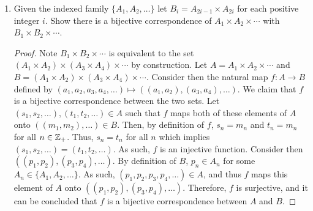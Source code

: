 \documentclass[12pt]{article}
\begin{document}
\begin{enumerate}[label=(\alph*)]
\begin{proof}
			To show $f$ is surjective, consider the element 
			$((c_1, \ldots, c_{n - 1}), c_n)$ in the set being mapped onto by
			$f$. By construction, $c_i \in A_i$ for $1 \leq i \leq n$.
			Thus, $(c_1, \ldots, c_n) \in A_1 \times \cdots \times A_n$.
			By definition of $f$, $f(c_1, \ldots, c_n) = ((c_1, \ldots, c_{n - 1}), c_n)$.
			Thus, we have shown $f$ is also surjective, and therefore we conclude 
			$f$ is bijective.
		\end{proof}
		\item Given the indexed family $\{A_1, A_2, \ldots\}$ let $B_i = A_{2i - 1} \times A_{2i}$ for
		each positive integer $i$. Show there is a bijective correspondence of $A_1 \times A_2 \times \cdots$
		with $B_1 \times B_2 \times \cdots$.
		\begin{proof}
			Note $B_1 \times B_2 \times \cdots$ is equivalent to the set 
			$(A_1 \times A_2) \times (A_3 \times A_4) \times \cdots$ by 
			construction. Let $A = A_1 \times A_2 \times \cdots$ and
			$B = (A_1 \times A_2) \times (A_3 \times A_4) \times \cdots$.
			Consider then the natural map $f: A \to B$ defined by
			$(a_1, a_2, a_3, a_4, \ldots) \mapsto ((a_1, a_2), (a_3, a_4), \ldots)$.
			We claim that $f$ is a bijective correspondence between the two sets.
			Let $(s_1, s_2, \ldots), (t_1, t_2, \ldots) \in A$ such that 
			$f$ maps both of these elements of $A$ onto $((m_1, m_2), \ldots) \in B$.
			Then, by definition of $f$, $s_n = m_n$ and $t_n = m_n$ for all 
			$n \in \mathbb{Z}_{+}$. Thus, $s_n = t_n$ for all $n$ which implies 
			$(s_1, s_2, \ldots) = (t_1, t_2, \ldots)$. As such, $f$ is an injective
			function. Consider then $((p_1, p_2), (p_3, p_4), \ldots)$. By definition
			of $B$, $p_n \in A_n$ for some $A_n \in \{A_1, A_2, \ldots\}$. As such,
			$(p_1, p_2, p_3, p_4, \ldots) \in A$, and thus $f$ maps this element of
			$A$ onto $((p_1, p_2), (p_3, p_4), \ldots)$. Therefore, $f$ is surjective, and 
			it can be concluded that $f$ is a bijective correspondence between 
			$A$ and $B$. 
		\end{proof}
	\end{enumerate}
	
\end{document}
